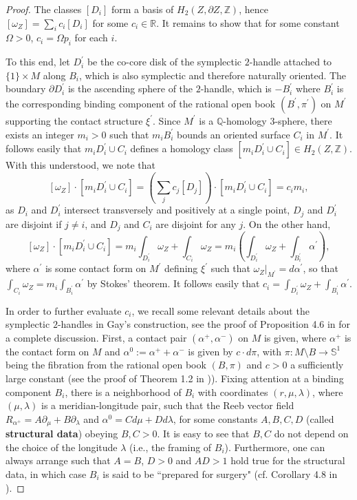 \documentclass[11pt]{amsart}
\theoremstyle{plain}
\numberwithin{theorem}{section}
\theoremstyle{definition}
\newcommand{\R}{{\mathbb R}}
\newcommand{\Z}{{\mathbb Z}}
\newcommand{\Q}{{\mathbb Q}}
\newcommand{\s}{{\mathbb S}}
\begin{document}
\begin{proof}
The classes $[D_i]$ form a basis of $H_2(Z,\partial Z,\Z)$, hence 
$[\omega_Z]=\sum_i c_i [D_i]$ for some $c_i\in \R$. It remains to show that for some constant 
$\Omega>0$, $c_i=\Omega p_i$ for each $i$.

To this end, let $D_i^\prime$ be the co-core disk of the symplectic $2$-handle attached to 
$\{1\}\times M$ along $B_i$, which is also symplectic and therefore naturally oriented. The boundary
$\partial D_i^\prime$ is the ascending sphere of the $2$-handle, which is $-B_i^\prime$ where $B_i^\prime$ is the corresponding binding component of the rational open book 
$(B^\prime,\pi^\prime)$ on $M^\prime$ supporting the contact structure $\xi^\prime$. Since $M^\prime$ is a $\Q$-homology $3$-sphere, there exists an integer $m_i>0$ such that $m_i B_i^\prime$ bounds an oriented surface $C_i$ in $M^\prime$. It follows easily that $m_i D_i^\prime\cup C_i$ defines a homology class 
$[m_i D_i^\prime\cup C_i]\in H_2(Z,\Z)$. With this understood, we note that 
$$
[\omega_Z]\cdot [m_i D_i^\prime\cup C_i]=(\sum_j c_j [D_j])\cdot [m_i D_i^\prime\cup C_i]=c_im_i,
$$
as $D_i$ and $D_i^\prime$ intersect transversely and positively at a single point, $D_j$ and $D_i^\prime$ are disjoint if $j\neq i$, and $D_j$ and $C_i$ are disjoint for any $j$. On the other hand, 
$$
[\omega_Z]\cdot [m_i D_i^\prime\cup C_i]=m_i \int_{D_i^\prime}\omega_Z+\int_{C_i} \omega_Z=
m_i(\int_{D_i^\prime}\omega_Z+ \int_{B_i^\prime} \alpha^\prime), 
$$ 
where $\alpha^\prime$ is some contact form on $M^\prime$ defining $\xi^\prime$ such that
$\omega_Z|_{M^\prime}=d\alpha^\prime$, so that $\int_{C_i} \omega_Z=m_i  \int_{B_i^\prime} \alpha^\prime$ by Stokes' theorem. It follows easily that $c_i=\int_{D_i^\prime}\omega_Z+ \int_{B_i^\prime} \alpha^\prime$.

In order to further evaluate $c_i$, we recall some relevant details about the symplectic 
$2$-handles in Gay's construction, see the proof of Proposition 4.6 in \cite{G} for a complete discussion. First, a contact pair $(\alpha^{+},\alpha^{-})$ on $M$ is given, where $\alpha^{+}$ 
is the contact form on $M$ and $\alpha^0:=\alpha^{+}+\alpha^{-}$ is given by $c\cdot d\pi$, with 
$\pi: M\setminus B\rightarrow\s^1$ being the fibration from the rational open book $(B,\pi)$ 
and $c>0$ a sufficiently large constant (see the proof of Theorem 1.2 in \cite{G})). Fixing
attention at a binding component $B_i$, there is a neighborhood of $B_i$ with coordinates 
$(r,\mu,\lambda)$, where $(\mu,\lambda)$ is a meridian-longitude pair, such that the Reeb 
vector field $R_{\alpha^{+}}=A\partial_\mu+ B\partial_\lambda$ and $\alpha^0=Cd\mu+D d\lambda$, for some constants $A,B,C,D$ (called {\bf structural data}) obeying $B,C>0$. It is easy to see that $B,C$ do not depend on the choice of the longitude $\lambda$ (i.e., the framing of $B_i$). Furthermore, one can always arrange such that $A=B$, $D>0$ and $AD>1$ hold true for the structural data, in which case $B_i$ is said to be ``prepared for surgery" (cf. Corollary 4.8 in \cite{G}). 


\end{proof}
\end{document}
